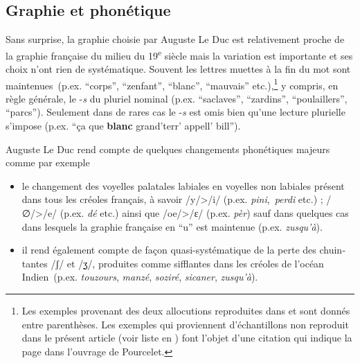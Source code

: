 \documentclass[output=paper]{langscibook}
\begin{document}
\begin{otherlanguage}{french}
\subsection{Graphie et phonétique}\label{sec:kriegel:4.1}

Sans surprise, la graphie choisie par Auguste Le Duc est relativement proche de la graphie française du milieu du 19\textsuperscript{e} siècle mais la variation est importante et ses choix n’ont rien de systématique. Souvent les lettres muettes à la fin du mot sont maintenues~(p.ex. “corps”, “zenfant”, “blanc”, “mauvais” etc.),\footnote{Les exemples provenant des deux allocutions reproduites dans  et  sont donnés entre parenthèses. Les exemples qui proviennent d’échantillons non reproduit dans le présent article (voir liste en ) font l’objet d’une citation qui indique la page dans l’ouvrage de Pourcelet.} y compris, en règle générale, le -\textit{s} du pluriel nominal (p.ex. “saclaves”, “zardins”, “poulaillers”, “parcs”). Seulement dans de rares cas le -\textit{s} est omis bien qu’une lecture plurielle s’impose (p.ex. “ça que \textbf{blanc} grand’terr’ appell’ bill”).

Auguste Le Duc rend compte de quelques changements phonétiques majeurs comme par exemple 

\begin{itemize}\sloppy
\item le changement des voyelles palatales labiales en voyelles non labiales présent dans tous les créoles français, à savoir /y/>/i/ (p.ex. \textit{pini},~\textit{perdi} etc.) ; /∅/>/e/ (p.ex. \textit{dé} etc.) ainsi que /oe/>/ɛ/ (p.ex. \textit{pèr}) sauf dans quelques cas dans lesquels la graphie française en “u” est maintenue (p.ex. \textit{zusqu’à}).
\item il rend également compte de façon quasi-systématique de la perte des chuintantes /\href{https://en.wikipedia.org/wiki/Voiceless_postalveolar_fricative}{ʃ}/ et /\href{https://en.wikipedia.org/wiki/Voiced_postalveolar_fricative}{{ʒ}}/, produites comme sifflantes dans les créoles de l’océan Indien~(p.ex. \textit{touzours}, \textit{manzé}, \textit{soziré}, \textit{sicaner}, \textit{zusqu’à}).
\end{itemize}


\end{otherlanguage}
\end{document}
